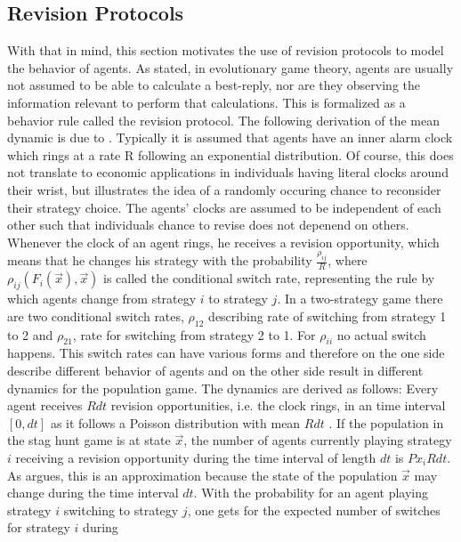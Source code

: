 \documentclass[11pt]{article}
\begin{document}
\subsection{Revision Protocols}
\label{sec:revisionprotocols}
With that in mind, this section motivates the use of revision protocols to
model the behavior of agents.
As stated, in evolutionary game theory, agents are usually not assumed to be 
able to calculate a best-reply, nor are they observing the information relevant
to perform that calculations. This is formalized as a behavior rule called
the revision protocol. The following derivation of the mean dynamic is due to 
\textcite{sandholm_population_2010}. Typically it is 
assumed that agents have an inner alarm clock which rings at a rate R 
following an exponential distribution. Of course, this does not translate 
to economic applications in individuals having literal clocks around their
wrist, but illustrates the idea of a randomly occuring chance to reconsider
their strategy choice.
The agents' clocks are assumed to be independent of each other such that
individuals chance to revise does not depenend on others.
Whenever the clock of an agent rings, he
receives a revision opportunity, which means that he changes his strategy
with the probability $\frac{\rho_{ij}}{R}$, where
$\rho_{ij}(F_i(\vec{x}),\vec{x})$ is called the conditional switch rate,
representing the rule by which agents change from strategy 
$i$ to strategy $j$. 
In a two-strategy game there are two conditional switch rates, $\rho_{12}$ 
describing rate of switching from strategy 1 to 2 and $\rho_{21}$, 
rate for switching from strategy 2 to 1. For $\rho_{ii}$ no actual switch 
happens. This switch rates can have various forms and therefore on the one 
side describe different behavior of agents and on the other side result in 
different dynamics for the population game.
The dynamics are derived as follows:
Every agent receives $R dt$ revision opportunities, i.e. the clock rings, 
in an time interval $[0,dt]$ as it follows a Poisson distribution with
mean $Rdt$ \parencite[123]{sandholm_population_2010}. 
If the population in the stag hunt game is at state $\vec{x}$, the number 
of agents currently playing strategy $i$ receiving a revision opportunity 
during the time interval of length $dt$ is $Px_i R dt$. As 
\textcite{sandholm_population_2010} argues, this is an approximation because
the state of the population $\vec{x}$ may change during the time interval $dt$.
With the probability for an agent playing strategy $i$ switching to strategy
$j$, one gets for the expected number of switches for strategy $i$ during 
\end{document}
